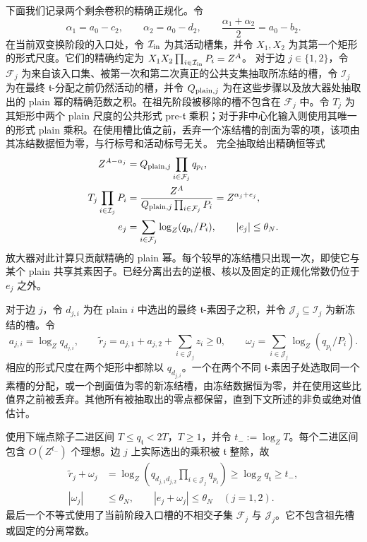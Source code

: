 \documentclass[11pt,a4paper]{article}
\numberwithin{equation}{section}
\numberwithin{figure}{section}
\theoremstyle{definition}
\theoremstyle{remark}
\begin{document}
下面我们记录两个剩余卷积的精确正规化。令
\[
 \alpha_1=a_0-c_2,\qquad \alpha_2=a_0-d_2,\qquad
 \frac{\alpha_1+\alpha_2}{2}=a_0-b_2.
\]
在当前双变换阶段的入口处，令 \(\mathcal I_{\rm in}\) 为其活动槽集，并令 \(X_1,X_2\) 为其第一个矩形的形式尺度。它们的精确约定为 \(X_1X_2\prod_{i\in\mathcal I_{\rm in}}P_i=Z^A\)。
对于边 \(j\in\{1,2\}\)，令 \(\mathcal F_j\) 为来自该入口集、被第一次和第二次真正的公共支集抽取所冻结的槽，令 \(\mathcal I_j\) 为在最终 \(\mathfrak t\)-分配之前仍然活动的槽，并令 \(Q_{{\rm plain},j}\) 为在这些步骤以及放大器处抽取出的 plain 幂的精确范数之积。在祖先阶段被移除的槽不包含在 \(\mathcal F_j\) 中。令 \(T_j\) 为其矩形中两个 plain 尺度的公共形式 pre-\(\mathfrak t\) 乘积；对于非中心化输入则使用其唯一的形式 plain 乘积。在使用槽比值之前，丢弃一个冻结槽的剖面为零的项，该项由其冻结数据恒为零，与行标号和活动标号无关。
完全抽取给出精确恒等式
\[
 \begin{aligned}
 Z^{A-\alpha_j}
   &=Q_{{\rm plain},j}\prod_{i\in\mathcal F_j}q_{p_i},\\
 T_j\prod_{i\in\mathcal I_j}P_i
   &=\frac{Z^A}{Q_{{\rm plain},j}\prod_{i\in\mathcal F_j}P_i}
     =Z^{\alpha_j+e_j},\\
 e_j&=\sum_{i\in\mathcal F_j}\log_Z(q_{p_i}/P_i),
 \qquad |e_j|\le\theta_N.
 \end{aligned}
\]
放大器对此计算只贡献精确的 plain 幂。每个较早的冻结槽只出现一次，即使它与某个 plain 共享其素因子。已经分离出去的逆根、核以及固定的正规化常数仍位于 \(e_j\) 之外。

对于边 \(j\)，令 \(d_{j,i}\) 为在 plain \(i\) 中选出的最终 \(\mathfrak t\)-素因子之积，并令 \(\mathcal J_j\subseteq\mathcal I_j\) 为新冻结的槽。令
\[
 a_{j,i}=\log_Zq_{d_{j,i}},\qquad
 \widetilde r_j=a_{j,1}+a_{j,2}+\sum_{i\in\mathcal J_j}z_i\ge0,
 \qquad
 \omega_j=\sum_{i\in\mathcal J_j}\log_Z(q_{p_i}/P_i).
\]
相应的形式尺度在两个矩形中都除以 \(q_{d_{j,i}}\)。一个在两个不同 \(\mathfrak t\)-素因子处选取同一个素槽的分配，或一个剖面值为零的新冻结槽，由冻结数据恒为零，并在使用这些比值界之前被丢弃。其他所有被抽取出的零点都保留，直到下文所述的非负或绝对值估计。

使用下端点除子二进区间 \(T\le q_{\mathfrak t}<2T\)，\(T\ge1\)，并令 \(t_-:=\log_ZT\)。每个二进区间包含 \(O(Z^{t_-})\) 个理想。边 \(j\) 上实际选出的乘积被 \(\mathfrak t\) 整除，故
\begin{equation}
 \begin{aligned}
 \widetilde r_j+\omega_j
 &=\log_Z\left(q_{d_{j,1}d_{j,2}}
                  \prod_{i\in\mathcal J_j}q_{p_i}\right)
 \ge\log_Zq_{\mathfrak t}\ge t_-,\\
 |\omega_j|&\le\theta_N,\qquad |e_j+\omega_j|\le\theta_N
 \quad(j=1,2).
 \end{aligned}
 \label{eq:centered-divisor-boundary}
\end{equation}
最后一个不等式使用了当前阶段入口槽的不相交子集 \(\mathcal F_j\) 与 \(\mathcal J_j\)。它不包含祖先槽或固定的分离常数。
\end{document}
